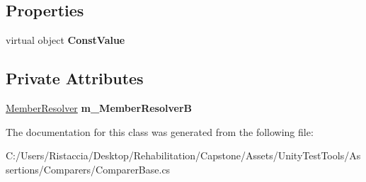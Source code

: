 \subsection*{Properties}
\begin{DoxyCompactItemize}
\item 
\mbox{\label{class_unity_test_1_1_comparer_base_a7c0c4f9843270cb3fca31e41d09eb54d}} 
virtual object {\bfseries Const\+Value}
\end{DoxyCompactItemize}
\subsection*{Private Attributes}
\begin{DoxyCompactItemize}
\item 
\mbox{\label{class_unity_test_1_1_comparer_base_ae490e8a7e28812c54c5e4b845f07479b}} 
\hyperlink{class_unity_test_1_1_member_resolver}{Member\+Resolver} {\bfseries m\+\_\+\+Member\+ResolverB}
\end{DoxyCompactItemize}


The documentation for this class was generated from the following file\+:\begin{DoxyCompactItemize}
\item 
C\+:/\+Users/\+Ristaccia/\+Desktop/\+Rehabilitation/\+Capstone/\+Assets/\+Unity\+Test\+Tools/\+Assertions/\+Comparers/Comparer\+Base.\+cs\end{DoxyCompactItemize}
